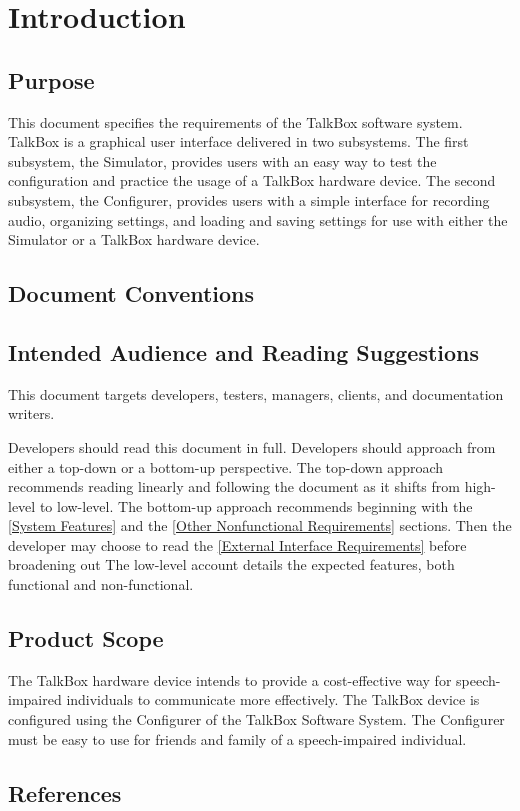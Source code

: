 \chapter{Introduction}
\label{ch:intro}
\section{Purpose}
This document specifies the requirements of the TalkBox software system. TalkBox is a graphical user interface delivered in two subsystems. The first subsystem, the Simulator, provides users with an easy way to test the configuration and practice the usage of a TalkBox hardware device. The second subsystem, the Configurer, provides users with a simple interface for recording audio, organizing settings, and loading and saving settings for use with either the Simulator or a TalkBox hardware device.
\section{Document Conventions}
\section{Intended Audience and Reading Suggestions}
This document targets developers, testers, managers, clients, and documentation writers. 

Developers should read this document in full. Developers should approach from either a top-down or a bottom-up perspective. The top-down approach recommends reading linearly and following the document as it shifts from high-level to low-level. 
The bottom-up approach recommends beginning with the \ref{System Features} and the \ref{Other Nonfunctional Requirements}  sections. Then the developer may choose to read the \ref{External Interface Requirements} before broadening out
The low-level account details the expected features, both functional and non-functional. 

\section{Product Scope}
The TalkBox hardware device intends to provide a cost-effective way for speech-impaired individuals to communicate more effectively. The TalkBox device is configured using the Configurer of the TalkBox Software System. The Configurer must be easy to use for friends and family of a speech-impaired individual.
\section{References}



